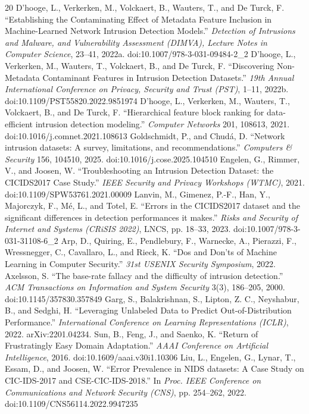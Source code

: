 \documentclass[journal]{IEEEtran}
\begin{document}
\begin{thebibliography}{20}
 D'hooge, L., Verkerken, M., Volckaert, B., Wauters, T., and De Turck, F. ``Establishing the Contaminating Effect of Metadata Feature Inclusion in Machine-Learned Network Intrusion Detection Models.'' \emph{Detection of Intrusions and Malware, and Vulnerability Assessment (DIMVA), Lecture Notes in Computer Science}, 23--41, 2022a. doi:10.1007/978-3-031-09484-2\_2
 D'hooge, L., Verkerken, M., Wauters, T., Volckaert, B., and De Turck, F. ``Discovering Non-Metadata Contaminant Features in Intrusion Detection Datasets.'' \emph{19th Annual International Conference on Privacy, Security and Trust (PST)}, 1--11, 2022b. doi:10.1109/PST55820.2022.9851974
 D'hooge, L., Verkerken, M., Wauters, T., Volckaert, B., and De Turck, F. ``Hierarchical feature block ranking for data-efficient intrusion detection modeling.'' \emph{Computer Networks} 201, 108613, 2021. doi:10.1016/j.comnet.2021.108613
 Goldschmidt, P., and Chudá, D. ``Network intrusion datasets: A survey, limitations, and recommendations.'' \emph{Computers \& Security} 156, 104510, 2025. doi:10.1016/j.cose.2025.104510
 Engelen, G., Rimmer, V., and Joosen, W. ``Troubleshooting an Intrusion Detection Dataset: the CICIDS2017 Case Study.'' \emph{IEEE Security and Privacy Workshops (WTMC)}, 2021. doi:10.1109/SPW53761.2021.00009
 Lanvin, M., Gimenez, P.-F., Han, Y., Majorczyk, F., Mé, L., and Totel, E. ``Errors in the CICIDS2017 dataset and the significant differences in detection performances it makes.'' \emph{Risks and Security of Internet and Systems (CRiSIS 2022)}, LNCS, pp. 18--33, 2023. doi:10.1007/978-3-031-31108-6\_2
 Arp, D., Quiring, E., Pendlebury, F., Warnecke, A., Pierazzi, F., Wressnegger, C., Cavallaro, L., and Rieck, K. ``Dos and Don'ts of Machine Learning in Computer Security.'' \emph{31st USENIX Security Symposium}, 2022.
 Axelsson, S. ``The base-rate fallacy and the difficulty of intrusion detection.'' \emph{ACM Transactions on Information and System Security} 3(3), 186--205, 2000. doi:10.1145/357830.357849
 Garg, S., Balakrishnan, S., Lipton, Z. C., Neyshabur, B., and Sedghi, H. ``Leveraging Unlabeled Data to Predict Out-of-Distribution Performance.'' \emph{International Conference on Learning Representations (ICLR)}, 2022. arXiv:2201.04234.
 Sun, B., Feng, J., and Saenko, K. ``Return of Frustratingly Easy Domain Adaptation.'' \emph{AAAI Conference on Artificial Intelligence}, 2016. doi:10.1609/aaai.v30i1.10306
 Liu, L., Engelen, G., Lynar, T., Essam, D., and Joosen, W. ``Error Prevalence in NIDS datasets: A Case Study on CIC-IDS-2017 and CSE-CIC-IDS-2018.'' In \emph{Proc. IEEE Conference on Communications and Network Security (CNS)}, pp. 254--262, 2022. doi:10.1109/CNS56114.2022.9947235

\end{thebibliography}
\end{document}
